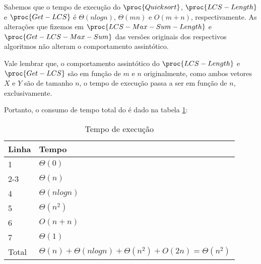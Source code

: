Sabemos que o tempo de execução do $\proc{Quicksort}$, $\proc{LCS-Length}$ e $\proc{Get-LCS}$ é $\Theta(n log n)$, $\Theta(mn)$ e $O(m + n)$, respectivamente. As alterações que fizemos em $\proc{LCS-Max-Sum-Length}$ e $\proc{Get-LCS-Max-Sum}$ das versões originais dos respectivos algoritmos não alteram o comportamento assintótico.

Vale lembrar que, o comportamento assintótico do $\proc{LCS-Length}$ e $\proc{Get-LCS}$ são em função de $m$ e $n$ originalmente, como ambos vetores $X$ e $Y$ são de tamanho $n$, o tempo de execução passa a ser em função de $n$, exclusivamente.

Portanto, o consumo de tempo total do  é dado na tabela \ref{tbl:6-12-1}:
\begin{table}[H]
\centering
\begin{tabular}{|l|l|}
\hline
Linha                   & Tempo \\ \hline
1 & $\Theta(0)$ \\ \hline
2-3 & $\Theta(n)$ \\ \hline
4 & $\Theta(n log n)$ \\ \hline
5 & $\Theta(n^2)$ \\ \hline
6 & $O(n + n)$ \\ \hline
7 & $\Theta(1)$ \\ \hline
Total & $\Theta(n) + \Theta(n log n) + \Theta(n^2)  + O(2n) = \Theta(n^2)$ \\ \hline
\end{tabular}
\caption{Tempo de execução}
\label{tbl:6-12-1}
\end{table}